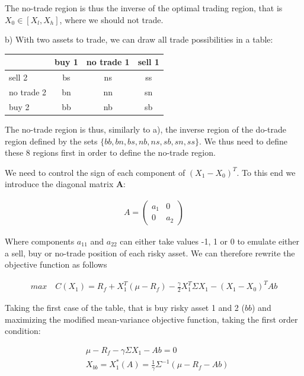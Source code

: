 \documentclass[10pt]{article}
\begin{document}
The no-trade region is thus the inverse of the optimal trading region, that is $X_0 \in [X_l, X_h]$, where we should not trade.

\bigbreak

b) With two assets to trade, we can draw all trade possibilities in a table:

\begin{center}
\begin{tabular}{|l|c|c|c|}
\hline
           & \multicolumn{1}{l|}{buy 1} & \multicolumn{1}{l|}{no trade 1} & \multicolumn{1}{l|}{sell 1} \\ \hline
sell 2      & bs  & ns & ss \\ \hline
no trade 2 & bn  & nn & sn \\ \hline
buy 2     & bb & nb & sb  \\ \hline
\end{tabular}
\end{center}

The no-trade region is thus, similarly to a), the inverse region of the do-trade region defined by the sets $\{bb, bn, bs, nb, ns, sb, sn, ss\}$. We thus need to define these 8 regions first in order to define the no-trade region.

\smallbreak

We need to control the sign of each component of $(X_1 - X_0)^T$. To this end we introduce the diagonal matrix \textbf{A}:

\begin{align*}
	A = \begin{pmatrix}
a_{1} & 0\\
0 & a_{2}
\end{pmatrix}
\end{align*}

Where components $a_{11}$ and $a_{22}$ can either take values -1, 1 or 0 to emulate either a sell, buy or no-trade position of each risky asset. We can therefore rewrite the objective function as follows

\begin{align*}
	max \quad C(X_1) = R_f  + X_1^T(\mu - R_f)  - \frac{\gamma}{2} X_1^T \Sigma X_1  - (X_1  - X_0)^TAb
\end{align*}

Taking the first case of the table, that is buy risky asset 1 and 2 ($bb$) and maximizing the modified mean-variance objective function, taking the first order condition: 

\begin{align*}
	& \mu - R_f - \gamma \Sigma X_1 - Ab = 0\\
	& X_{bb} = X_1^*(A) = \frac{1}{\gamma}\Sigma^{-1} (\mu - R_f - Ab)
\end{align*}
\end{document}
